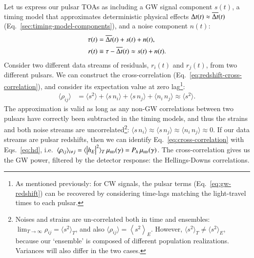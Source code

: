 \documentclass[onecolumn,authoryear]{els-mrw}
\begin{document}
Let us express our pulsar TOAs as including a GW signal component $s(t)$, a timing model that approximates deterministic physical effects ${\Delta{}t}(t) \approx \overline{{\Delta{}t}}(t)$ (Eq.~\ref{sec:timing-model-components}), and a noise component $n(t)$:
\begin{align}\label{eq:toa-components-gw}
    {\tau}(t) & = \overline{{\Delta{}t}}(t) + s(t) + n(t), \\
    r(t) & \equiv {\tau} - \overline{{\Delta{}t}}(t) \approx s(t) + n(t).
\end{align}
Consider two different data streams of residuals, $r_i(t)$ and $r_j(t)$, from two different pulsars.  We can construct the cross-correlation (Eq.~\ref{eq:redshift-cross-correlation}), and consider its expectation value at zero lag\footnote{As mentioned previously: for CW signals, the pulsar terms (Eq.~\ref{eq:gw-redshift}) can be recovered by considering time-lags matching the light-travel times to each pulsar.}:
\begin{align}\label{eq:cross-correlation}
    \langle \rho_{ij} \rangle & = \langle s^2 \rangle + \langle s \, n_i \rangle + \langle s \, n_j \rangle + \langle n_i \, n_j \rangle \approx \langle s^2 \rangle.
\end{align}
The approximation is valid as long as any non-GW correlations between two pulsars have correctly been subtracted in the timing models, and thus the strains and both noise streams are uncorrelated\footnote{Noises and strains are un-correlated both in time and ensembles: $\lim_{T \rightarrow \infty} \rho_{ij} = \langle s^2 \rangle_T$, and also \mbox{$\langle \rho_{ij} \rangle = \left< s^2 \right>_E$}.  However, $\langle s^2 \rangle_T \neq \langle s^2 \rangle_E$, because our `ensemble' is composed of different population realizations.  Variances will also differ in the two cases.}: \mbox{$\langle s \, n_i \rangle \approx \langle s \, n_j \rangle \approx \langle n_i \, n_j \rangle \approx 0$}.  If our data streams are pulsar redshifts, then we can identify Eq.~\ref{eq:cross-correlation} with Eqs.~\ref{eq:hd}, i.e.~\mbox{$\langle \rho_{ij} \rangle_{i \neq j} = \langle \big| h_E \big|^2 \rangle_T \, \hdfunc(\gamma) = P_h \, \hdfunc(\gamma)$}.  The cross-correlation gives us the GW power, filtered by the detector response: the Hellings-Downs correlations.
\end{document}
